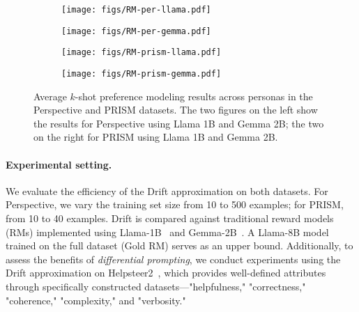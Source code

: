\begin{figure*}[th]
    \centering
        \begin{subfigure}{0.24\textwidth}
            \centering
            \texttt{[image: figs/RM-per-llama.pdf]}
        \end{subfigure}
        \begin{subfigure}{0.24\textwidth}
            \centering
            \texttt{[image: figs/RM-per-gemma.pdf]}
        \end{subfigure}
        \begin{subfigure}{0.24\textwidth}
            \centering
            \texttt{[image: figs/RM-prism-llama.pdf]}
        \end{subfigure}
        \begin{subfigure}{0.24\textwidth}
            \centering
            \texttt{[image: figs/RM-prism-gemma.pdf]}
        \end{subfigure}
    \caption{
    Average $k$-shot preference modeling results across personas in the Perspective and PRISM datasets. The two figures on the left show the results for Perspective using Llama 1B and Gemma 2B; the two on the right for PRISM using Llama 1B and Gemma 2B.
    }
    \label{fig:rm-results}
\vspace{-5mm}
\end{figure*}

\paragraph{Experimental setting.}
We evaluate the efficiency of the Drift approximation on both datasets. For Perspective, we vary the training set size from 10 to 500 examples; for PRISM, from 10 to 40 examples. Drift is compared against traditional reward models (RMs) implemented using Llama-1B~\citep{llama} and Gemma-2B~\citep{gemma}. A Llama-8B model trained on the full dataset (Gold RM) serves as an upper bound. Additionally, to assess the benefits of \textit{differential prompting}, we conduct experiments using the Drift approximation on Helpsteer2~\citep{helpsteer}, which provides well-defined attributes through specifically constructed datasets—"helpfulness," "correctness," "coherence," "complexity," and "verbosity."

